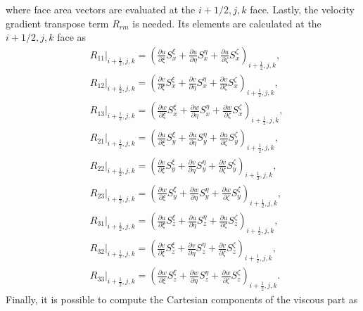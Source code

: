 where face area vectors are evaluated at the $i+1/2,j,k$ face. Lastly, the velocity gradient transpose term $R_{rm}$ is needed. Its elements are calculated at the $i+1/2,j,k$ face as 
\begin{align}
	& \left.R_{11}\right|_{i+\frac{1}{2}, j, k}=\left(\frac{\partial u}{\partial \xi} S_x^{\xi}+\frac{\partial u}{\partial \eta} S_x^\eta+\frac{\partial u}{\partial \zeta} S_x^\zeta\right)_{i+\frac{1}{2}, j, k}, \nonumber \\
	& \left.R_{12}\right|_{i+\frac{1}{2}, j, k}=\left(\frac{\partial v}{\partial \xi} S_x^{\xi}+\frac{\partial v}{\partial \eta} S_x^\eta+\frac{\partial v}{\partial \zeta} S_x^\zeta\right)_{i+\frac{1}{2}, j, k}, \nonumber \\
	& \left.R_{13}\right|_{i+\frac{1}{2}, j, k}=\left(\frac{\partial w}{\partial \xi} S_x^{\xi}+\frac{\partial w}{\partial \eta} S_x^\eta+\frac{\partial w}{\partial \zeta} S_x^\zeta\right)_{i+\frac{1}{2}, j, k}, \nonumber \\
	& \left.R_{21}\right|_{i+\frac{1}{2}, j, k}=\left(\frac{\partial u}{\partial \xi} S_y^{\xi}+\frac{\partial u}{\partial \eta} S_y^\eta+\frac{\partial u}{\partial \zeta} S_y^\zeta\right)_{i+\frac{1}{2}, j, k}, \nonumber \\
	& \left.R_{22}\right|_{i+\frac{1}{2}, j, k}=\left(\frac{\partial v}{\partial \xi} S_y^{\xi}+\frac{\partial v}{\partial \eta} S_y^\eta+\frac{\partial v}{\partial \zeta} S_y^\zeta\right)_{i+\frac{1}{2}, j, k}, \nonumber \\
	& \left.R_{23}\right|_{i+\frac{1}{2}, j, k}=\left(\frac{\partial w}{\partial \xi} S_y^{\xi}+\frac{\partial w}{\partial \eta} S_y^\eta+\frac{\partial w}{\partial \zeta} S_y^\zeta\right)_{i+\frac{1}{2}, j, k}, \nonumber \\
	& \left.R_{31}\right|_{i+\frac{1}{2}, j, k}=\left(\frac{\partial u}{\partial \xi} S_z^{\xi}+\frac{\partial u}{\partial \eta} S_z^\eta+\frac{\partial u}{\partial \zeta} S_z^\zeta\right)_{i+\frac{1}{2}, j, k}, \nonumber \\
	& \left.R_{32}\right|_{i+\frac{1}{2}, j, k}=\left(\frac{\partial v}{\partial \xi} S_z^{\xi}+\frac{\partial v}{\partial \eta} S_z^\eta+\frac{\partial v}{\partial \zeta} S_z^\zeta\right)_{i+\frac{1}{2}, j, k}, \nonumber \\
	& \left.R_{33}\right|_{i+\frac{1}{2}, j, k}=\left(\frac{\partial w}{\partial \xi} S_z^{\xi}+\frac{\partial w}{\partial \eta} S_z^\eta+\frac{\partial w}{\partial \zeta} S_z^\zeta\right)_{i+\frac{1}{2}, j, k}.
\end{align}
Finally, it is possible to compute the Cartesian components of the viscous part as
